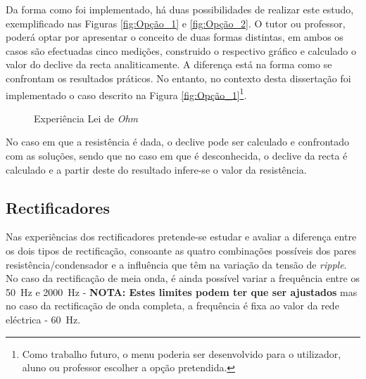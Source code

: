 Da forma como foi implementado, há duas possibilidades de realizar este estudo, exemplificado nas Figuras \ref{fig:Opção_1} e \ref{fig:Opção_2}. O tutor ou professor, poderá optar por apresentar o conceito de duas formas distintas, em ambos os casos são efectuadas cinco medições, construido o respectivo gráfico e calculado o valor do declive da recta analiticamente. A diferença está na forma como se confrontam os resultados práticos. No entanto, no contexto desta dissertação foi  implementado o caso descrito na Figura \ref{fig:Opção_1}\footnote{Como trabalho futuro, o menu poderia ser desenvolvido para o utilizador, aluno ou professor escolher a opção pretendida.}. 

\begin{figure}[hbtp]
	\centering%
		\centering
		\qquad
		\caption{Experiência Lei de \textit{Ohm}}%
		\label{fig:experienciaOHM}%
	\end{figure}

No caso em que a resistência é dada, o declive pode ser calculado e confrontado com as soluções, sendo que no caso em que é desconhecida, o declive da recta é calculado e a partir deste do resultado infere-se o valor da resistência. 

\subsection{Rectificadores}
\label{sec:circuitosrectificadores}
Nas experiências dos rectificadores pretende-se estudar e avaliar a diferença entre os dois tipos de rectificação, consoante as quatro combinações possíveis dos pares resistência/condensador e a influência que têm na variação da tensão de \textit{ripple}. No caso da rectificação de meia onda, é ainda possível variar a frequência entre os \SI{50}{\hertz} e \SI{2000}{\hertz} - \textbf{NOTA: Estes limites podem ter que ser ajustados} mas no caso da rectificação de onda completa, a frequência é fixa ao valor da rede eléctrica - \SI{60}{\hertz}.

